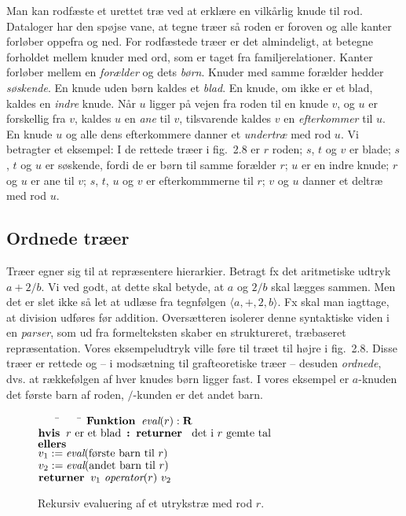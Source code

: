 Man kan rodfæste et urettet træ ved at erklære en vilkårlig knude til rod.
Dataloger har den spøjse vane, at tegne træer så roden er foroven  og alle kanter forløber oppefra og ned.
For rodfæstede træer er det almindeligt, at betegne forholdet mellem knuder med ord, som er taget fra familjerelationer.
Kanter forløber mellem en \emph{forælder} og dets \emph{børn}.
Knuder med samme forælder hedder \emph{søskende}.
En knude uden børn kaldes et \emph{blad}.
En knude, om ikke er et blad, kaldes en \emph{indre} knude.
Når $u$ ligger på vejen fra roden til en knude $v$, og $u$ er forskellig fra $v$, kaldes $u$ en \emph{ane} til $v$, tilsvarende kaldes $v$ en \emph{efterkommer} til $u$.
En knude $u$ og alle dens efterkommere danner et \emph{undertræ} med rod $u$.
Vi betragter et eksempel:
I de rettede træer i fig.~2.8 er $r$ roden; $s$, $t$ og $v$ er blade; $s$, $t$ og $u$ er søskende, fordi de er børn til samme forælder $r$; $u$ er en indre knude; $r$ og $u$ er ane til $v$; $s$, $t$, $u$ og $v$ er efterkommmerne til $r$; $v$ og $u$ danner et deltræ med rod $u$.

\subsection{Ordnede træer}

Træer egner sig til at repræsentere hierarkier.
Betragt fx det aritmetiske udtryk $a+2/b$.
Vi ved godt, at dette skal betyde, at $a$ og $2/b$ skal lægges sammen.
Men det er slet ikke så let at udlæse fra tegnfølgen $\langle a,+,2, b\rangle$.
Fx skal man iagttage, at division udføres før addition.
Oversætteren isolerer denne syntaktiske viden i en \emph{parser}, som ud fra formelteksten skaber en struktureret, træbaseret repræsentation.
Vores eksempeludtryk ville føre til træet til højre i fig.~2.8.
Disse træer er rettede og -- i modsætning til grafteoretiske træer -- desuden \emph{ordnede}, dvs. at rækkefølgen af hver knudes børn ligger fast.
I vores eksempel er $a$-knuden det første barn af roden, $/$-kunden er det andet barn.

\begin{figure}
  \newcommand{\eval}{\operatorname{\emph{eval}}}
  \begin{tabbing}
    ~~~~\=~~~~\=\kill
    $\Function \eval(r):\RR$\\
    \> $\operatorname{\textbf{hvis~}} r \text{ er et blad } \operatorname{\textbf{:~}} \operatorname{\textbf{returner~}} \text{ det i $r$ gemte tal}$\\
    \> $\operatorname{\textbf{ellers~}}$\\
    \>\> $v_1:= \eval(\text{første barn til $r$})$\\
    \>\> $v_2:= \eval(\text{andet barn til $r$})$\\
    \>\> $\operatorname{\textbf{returner~}} v_1 \text{ \emph{operator$(r)$} } v_2$
  \end{tabbing}
  \caption{Rekursiv evaluering af et utrykstræ med rod $r$.}
\end{figure}

